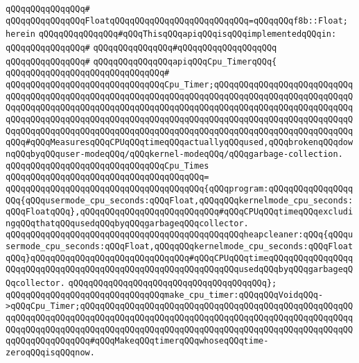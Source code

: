 \verb|qQQqqQQqqQQqqQQq#|\newline
\verb|qQQqqQQqqQQqqQQqFloatqQQqqQQqqQQqqQQqqQQqqQQqqQQq=qQQqqQQqf8b::Float;|\newline
\verb|herein|\newline
\newline
\verb|qQQqqQQqqQQqqQQq#qQQqThisqQQqapiqQQqisqQQqimplementedqQQqin:|\newline
\verb|qQQqqQQqqQQqqQQq#|\newline
\verb|qQQqqQQqqQQqqQQq#qQQqqQQqqQQqqQQqqQQq|\newline
\verb|qQQqqQQqqQQqqQQq#|\newline
\verb|qQQqqQQqqQQqqQQqapiqQQqCpu_TimerqQQq{|\newline
\verb|qQQqqQQqqQQqqQQqqQQqqQQqqQQqqQQq#|\newline
\verb|qQQqqQQqqQQqqQQqqQQqqQQqqQQqqQQqCpu_Timer;qQQqqQQqqQQqqQQqqQQqqQQqqQQqqQQqqQQqqQQqqQQqqQQqqQQqqQQqqQQqqQQqqQQqqQQqqQQqqQQqqQQqqQQqqQQqqQQqqQQqqQQqqQQqqQQqqQQqqQQqqQQqqQQqqQQqqQQqqQQqqQQqqQQqqQQqqQQqqQQqqQQqqQQqqQQqqQQqqQQqqQQqqQQqqQQqqQQqqQQqqQQqqQQqqQQqqQQqqQQqqQQqqQQqqQQqqQQqqQQqqQQqqQQqqQQqqQQqqQQqqQQqqQQqqQQqqQQqqQQqqQQqqQQqqQQqqQQqqQQqqQQqqQQqqQQq#qQQqMeasuresqQQqCPUqQQqtimeqQQqactuallyqQQqused,qQQqbrokenqQQqdownqQQqbyqQQquser-modeqQQq/qQQqkernel-modeqQQq/qQQqgarbage-collection.|\newline
\newline
\verb|qQQqqQQqqQQqqQQqqQQqqQQqqQQqqQQqCpu_Times|\newline
\verb|qQQqqQQqqQQqqQQqqQQqqQQqqQQqqQQqqQQqqQQq=|\newline
\verb|qQQqqQQqqQQqqQQqqQQqqQQqqQQqqQQqqQQqqQQq{qQQqprogram:qQQqqQQqqQQqqQQqqQQq{qQQqusermode_cpu_seconds:qQQqFloat,qQQqqQQqkernelmode_cpu_seconds:qQQqFloatqQQq},qQQqqQQqqQQqqQQqqQQqqQQqqQQq#qQQqCPUqQQqtimeqQQqexcludingqQQqthatqQQqusedqQQqbyqQQqgarbageqQQqcollector.|\newline
\verb|qQQqqQQqqQQqqQQqqQQqqQQqqQQqqQQqqQQqqQQqqQQqqQQqheapcleaner:qQQq{qQQqusermode_cpu_seconds:qQQqFloat,qQQqqQQqkernelmode_cpu_seconds:qQQqFloatqQQq}qQQqqQQqqQQqqQQqqQQqqQQqqQQqqQQq#qQQqCPUqQQqtimeqQQqqQQqqQQqqQQqqQQqqQQqqQQqqQQqqQQqqQQqqQQqqQQqqQQqqQQqqQQqqQQqusedqQQqbyqQQqgarbageqQQqcollector.|\newline
\verb|qQQqqQQqqQQqqQQqqQQqqQQqqQQqqQQqqQQqqQQq};|\newline
\newline
\newline
\verb|qQQqqQQqqQQqqQQqqQQqqQQqqQQqqQQqmake_cpu_timer:qQQqqQQqVoidqQQq->qQQqCpu_Timer;qQQqqQQqqQQqqQQqqQQqqQQqqQQqqQQqqQQqqQQqqQQqqQQqqQQqqQQqqQQqqQQqqQQqqQQqqQQqqQQqqQQqqQQqqQQqqQQqqQQqqQQqqQQqqQQqqQQqqQQqqQQqqQQqqQQqqQQqqQQqqQQqqQQqqQQqqQQqqQQqqQQqqQQqqQQqqQQqqQQqqQQqqQQqqQQqqQQqqQQqqQQqqQQqqQQq#qQQqMakeqQQqtimerqQQqwhoseqQQqtime-zeroqQQqisqQQqnow.|\newline

